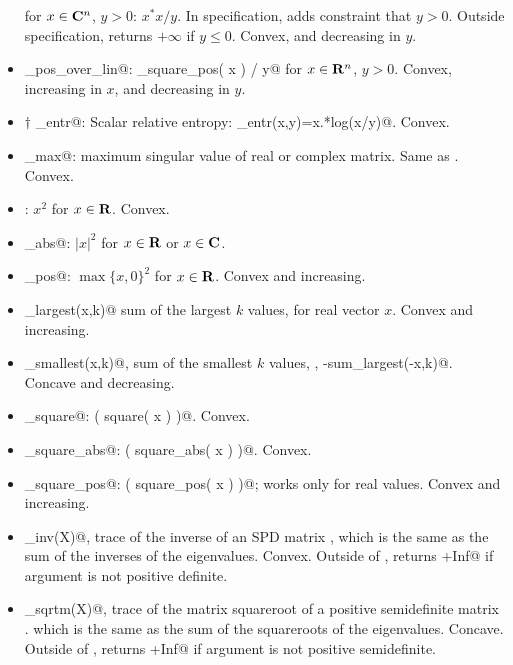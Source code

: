 \documentclass[12pt]{article}
\begin{document}
\begin{itemize}
for $x \in \mathbf{C}^n$, $y>0$: $x^*x/y$.  In \cvx specification,
adds constraint that $y>0$.  Outside \cvx specification,
returns $+\infty$ if $y\leq 0$.
Convex, and decreasing in $y$.
\item \verb@quad_pos_over_lin@: \verb@sum_square_pos( x ) / y@
for $x\in\R^n$, $y>0$.
Convex, increasing in $x$, and decreasing in $y$.
\item $\dagger$ \verb@rel_entr@: Scalar relative entropy: \verb@rel_entr(x,y)=x.*log(x/y)@. Convex.
\item \verb@sigma_max@: maximum singular value of real or 
complex matrix.  Same as \verb@norm@.  Convex.
\item \verb@square@: $x^2$ for $x \in \R$.
Convex.
\item \verb@square_abs@: $|x|^2$ for $x\in\R$ or $x\in\C$.
\item \verb@square_pos@: $\max\{x,0\}^2$ for $x\in\R$.
Convex and increasing.
\item \verb@sum_largest(x,k)@ sum of the largest $k$ values, for
real vector $x$.
Convex and increasing.
\item \verb@sum_smallest(x,k)@, sum of the smallest $k$ values,
\ie, \verb@-sum_largest(-x,k)@.
Concave and decreasing.
\item \verb@sum_square@: \verb@sum( square( x ) )@. Convex.
\item \verb@sum_square_abs@: \verb@sum( square_abs( x ) )@. Convex.
\item \verb@sum_square_pos@: \verb@sum( square_pos( x ) )@; 
works only for real values. Convex and increasing.

\item \verb@trace_inv(X)@, trace of the inverse of an SPD matrix \verb@X@,
which is the same as the sum of the inverses of the eigenvalues.
Convex. 
Outside of \cvx, returns \verb@+Inf@ if argument is not positive definite.

\item \verb@trace_sqrtm(X)@, trace of the matrix squareroot of a positive
semidefinite matrix 
\verb@X@. which is the same as the sum of the squareroots of the 
eigenvalues.  Concave. 
Outside of \cvx, returns \verb@+Inf@ if argument is not positive semidefinite.
\end{itemize}
\end{document}
